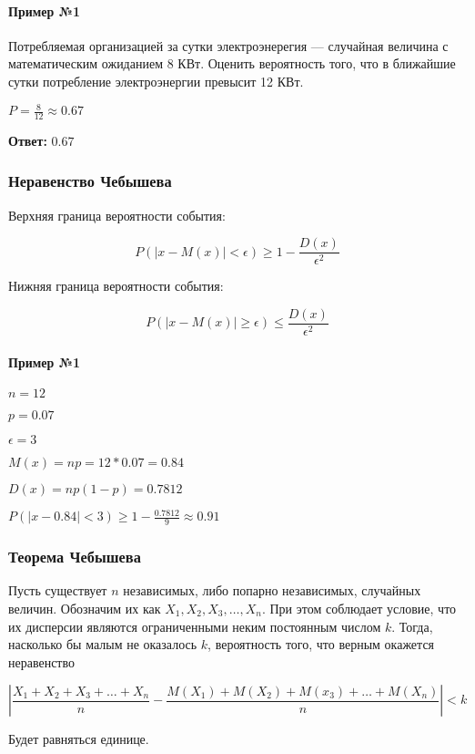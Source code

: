\documentclass{article}
\begin{document}
\paragraph{Пример №1}

Потребляемая организацией за сутки электроэнерегия — случайная величина с математическим ожиданием 8 КВт. Оценить вероятность того, что в ближайшие сутки потребление электроэнергии превысит 12 КВт.

$P = \frac{8}{12} \approx 0.67$

\textbf{Ответ:} $0.67$

\subsubsection{Неравенство Чебышева}

Верхняя граница вероятности события:

$$P(|x - M(x)| < \epsilon) \ge 1 - \frac{D(x)}{\epsilon^2}$$

Нижняя граница вероятности события:

$$P(|x - M(x)| \ge \epsilon) \le \frac{D(x)}{\epsilon^2}$$

\paragraph{Пример №1}

$n = 12$

$p = 0.07$

$\epsilon = 3$

$M(x) = np = 12 * 0.07 = 0.84$

$D(x) = np(1 - p) = 0.7812$

$P(|x - 0.84| < 3) \ge 1 - \frac{0.7812}{9} \approx 0.91$

\subsubsection{Теорема Чебышева}

Пусть существует $n$ независимых, либо попарно независимых, случайных величин. Обозначим их как $X_1, X_2, X_3, \dots, X_n$. При этом соблюдает условие, что их дисперсии являются ограниченными неким постоянным числом $k$. Тогда, насколько бы малым не оказалось $k$, вероятность того, что верным окажется неравенство

$$
|\frac{X_1 + X_2 + X_3 + \dots + X_n}{n} - \frac{M(X_1) + M(X_2) + M(x_3) + \dots + M(X_n)}{n}| < k
$$

Будет равняться единице.
\end{document}

